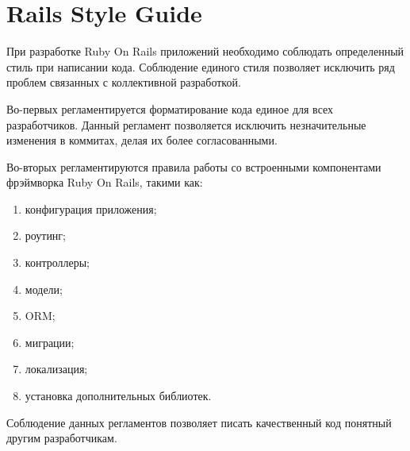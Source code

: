 \section{Rails Style Guide}
При разработке Ruby On Rails приложений необходимо соблюдать определенный стиль при написании кода. Соблюдение единого стиля позволяет исключить ряд проблем связанных с коллективной разработкой.

Во-первых регламентируется форматирование кода единое для всех разработчиков.
Данный регламент позволяется исключить незначительные изменения в коммитах,
делая их более согласованными.

Во-вторых регламентируются правила работы со встроенными компонентами фрэймворка
Ruby On Rails, такими как:
\begin{enumerate}
  \item конфигурация приложения;
  \item роутинг;
  \item контроллеры;
  \item модели;
  \item ORM;
  \item миграции;
  \item локализация;
  \item установка дополнительных библиотек.   
\end{enumerate}

Соблюдение данных регламентов позволяет писать качественный код понятный другим
разработчикам.
